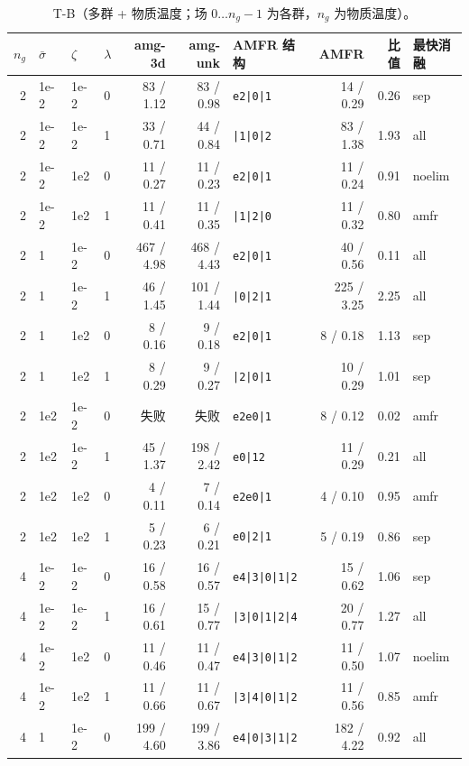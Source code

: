 \documentclass[11pt,a4paper]{ctexart}
\begin{document}
{\footnotesize\setlength{\tabcolsep}{4pt}
\begin{longtable}{rlll rr l rr l}
\caption{T-B（多群 + 物质温度；场 $0\ldots n_g-1$ 为各群，$n_g$ 为物质温度）。}\\
\toprule
$n_g$ & $\bar\sigma$ & $\zeta$ & $\lambda$ & amg-3d & amg-unk & AMFR 结构 & AMFR & 比值 & 最快消融 \\
\midrule
\endhead
2 & 1e-2 & 1e-2 & 0 & 83 / 1.12 & 83 / 0.98 & \texttt{e2|0|1} & 14 / 0.29 & 0.26 & sep \\
2 & 1e-2 & 1e-2 & 1 & 33 / 0.71 & 44 / 0.84 & \texttt{|1|0|2} & 83 / 1.38 & 1.93 & all \\
2 & 1e-2 & 1e2 & 0 & 11 / 0.27 & 11 / 0.23 & \texttt{e2|0|1} & 11 / 0.24 & 0.91 & noelim \\
2 & 1e-2 & 1e2 & 1 & 11 / 0.41 & 11 / 0.35 & \texttt{|1|2|0} & 11 / 0.32 & 0.80 & amfr \\
2 & 1 & 1e-2 & 0 & 467 / 4.98 & 468 / 4.43 & \texttt{e2|0|1} & 40 / 0.56 & 0.11 & all \\
2 & 1 & 1e-2 & 1 & 46 / 1.45 & 101 / 1.44 & \texttt{|0|2|1} & 225 / 3.25 & 2.25 & all \\
2 & 1 & 1e2 & 0 & 8 / 0.16 & 9 / 0.18 & \texttt{e2|0|1} & 8 / 0.18 & 1.13 & sep \\
2 & 1 & 1e2 & 1 & 8 / 0.29 & 9 / 0.27 & \texttt{|2|0|1} & 10 / 0.29 & 1.01 & sep \\
2 & 1e2 & 1e-2 & 0 & 失败 & 失败 & \texttt{e2e0|1} & 8 / 0.12 & 0.02 & amfr \\
2 & 1e2 & 1e-2 & 1 & 45 / 1.37 & 198 / 2.42 & \texttt{e0|12} & 11 / 0.29 & 0.21 & all \\
2 & 1e2 & 1e2 & 0 & 4 / 0.11 & 7 / 0.14 & \texttt{e2e0|1} & 4 / 0.10 & 0.95 & amfr \\
2 & 1e2 & 1e2 & 1 & 5 / 0.23 & 6 / 0.21 & \texttt{e0|2|1} & 5 / 0.19 & 0.86 & sep \\
4 & 1e-2 & 1e-2 & 0 & 16 / 0.58 & 16 / 0.57 & \texttt{e4|3|0|1|2} & 15 / 0.62 & 1.06 & sep \\
4 & 1e-2 & 1e-2 & 1 & 16 / 0.61 & 15 / 0.77 & \texttt{|3|0|1|2|4} & 20 / 0.77 & 1.27 & all \\
4 & 1e-2 & 1e2 & 0 & 11 / 0.46 & 11 / 0.47 & \texttt{e4|3|0|1|2} & 11 / 0.50 & 1.07 & noelim \\
4 & 1e-2 & 1e2 & 1 & 11 / 0.66 & 11 / 0.67 & \texttt{|3|4|0|1|2} & 11 / 0.56 & 0.85 & amfr \\
4 & 1 & 1e-2 & 0 & 199 / 4.60 & 199 / 3.86 & \texttt{e4|0|3|1|2} & 182 / 4.22 & 0.92 & all \\

\end{longtable}}
\end{document}
